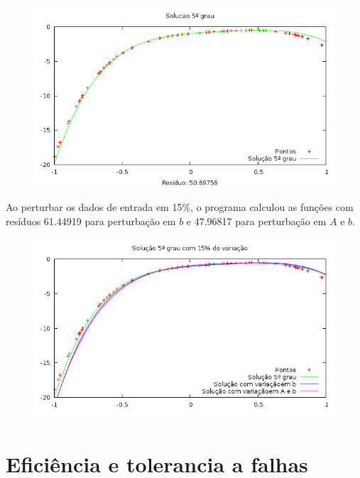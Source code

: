 \begin{figure}[h]
\centering
\includegraphics[scale=0.7]{sol5grau}
\end{figure}
Ao perturbar os dados de entrada em 15\%, o programa calculou as funções 
com resíduos 61.44919  para perturbação em $b$ e 47.96817 para perturbação em $A$ e $b$.
\begin{figure}[h]
\centering
\includegraphics[scale=0.7]{sol5grau_var}
\end{figure}

\chapter{Eficiência e tolerancia a falhas}

